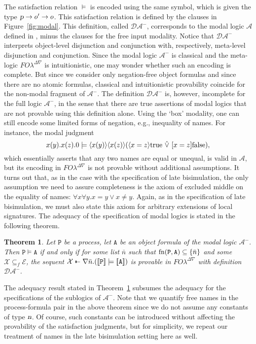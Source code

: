 \documentclass{acmtrans2m}
\newtheorem{theorem}{Theorem}
\def \mTrue {\hbox{true}}
\def \mFalse {\hbox{false}}
\def \mOr {\hat \lor}
\newcommand \mDia[1] {\langle #1 \rangle}
\newcommand \stf[2] {#1 \models #2}
\newcommand \actBox[2] {[#1] #2}
\newcommand \actDia[2] {\langle #1 \rangle #2}
\def\Ascr{{\mathcal A}}
\def\Dscr{{\mathcal D}}
\def\Escr{{\mathcal E}}
\def\Xscr{{\mathcal X}}
\def\Api{{\mathtt A}}
\def\Ppi{{\mathtt P}}
\def\relbar{\mathrel{\smash-}}
\def\joinrelm{\mathrel{\mkern-3.2mu}}
\def\tailpiece{\kern 1pt\vrule height 1ex width 0.3ex depth -.25ex}
\def\seqsym{\mathrel{\tailpiece\joinrelm\relbar}}
\newcommand{\FOL   }{FO\lambda}
\newcommand{\FOLDNb}{\FOL^{\Delta\nabla}}
\newcommand{\Seq}[2]{#1\seqsym #2}
\newcommand{\name}{\hbox{\sl n}}
\newcommand{\proc}{\hbox{\sl p}}
\newcommand{\ra}{\rightarrow}
\newcommand{\trans}[1]{[\![ #1 ]\!]}
\newcommand{\fn}[1]{{\rm fn}(#1)}
\begin{document}
The satisfaction relation $\models$ is encoded using the same symbol, 
which is given the type $\proc \ra o' \ra o$. This satisfaction
relation is defined by the clauses in Figure~\ref{fig:modal}.
This definition, called $\Dscr\Ascr^-$, 
corresponds to the modal logic $\Ascr$ defined in \cite{milner93tcs}, minus
the clauses for the free input modality.  
Notice that $\Dscr\Ascr^-$ interprets object-level disjunction and conjunction
with, respectively, meta-level disjunction and conjunction. Since the modal logic $\Ascr^-$
is classical and the meta-logic $\FOLDNb$ is intuitionistic, 
one may wonder whether such an encoding is complete. But since 
we consider only negation-free object formulas and since 
there are no atomic formulas, classical and intuitionistic provability
coincide for the non-modal fragment of $\Ascr^-$.
The definition $\Dscr\Ascr^-$ is, however, incomplete for the full logic $\Ascr^-$, 
in the sense that there are true assertions of modal logics that are not provable 
using this definition alone. Using the `box' modality, one can still encode 
some limited forms of negation, e.g., inequality of names. For instance, the modal judgment 
$$
\stf {x(y).x(z).0} {\mDia{x(y)} \mDia{x(z)} (\actDia{x = z} \mTrue ~ \mOr ~ \actBox{x = z} \mFalse)},
$$
which essentially asserts that any two names are equal or unequal, is valid in $\Ascr$, 
but its encoding in $\FOLDNb$ is not provable without additional assumptions. 
It turns out that, as in the case with the specification of late bisimulation,
the only assumption we need to assure completeness is the 
axiom of excluded middle on the equality of names: 
$
\forall x\forall y. x = y \lor x \not = y. 
$
Again, as in the specification of late bisimulation, we must also
state this axiom for arbitrary extensions of local signatures. 
The adequacy of the specification of modal logics is 
stated in the following theorem.

\begin{theorem}
\label{thm:modal adequacy}
Let $\Ppi$ be a process, let $\Api$ be an object formula of the modal logic $\Ascr^-$. 
Then $\Ppi \models \Api$ if and only if for some
list $\bar n$ such that $\fn{\Ppi, \Api} \subseteq \{\bar n \} $
and some  $\Xscr \subseteq_f \Escr$,  
the sequent 
$\Seq{\Xscr}{\nabla \bar n.(\trans{\Ppi} \models \trans{\Api})}$
is provable in $\FOLDNb$ with definition $\Dscr\Ascr^-$.
\end{theorem}

The adequacy result stated in Theorem~\ref{thm:modal adequacy}
subsumes the adequacy for the specifications of the sublogics of $\Ascr^-$.
Note that we quantify free names in the process-formula pair
in the above theorem since we do not assume any constants
of type $\name$. Of course, such constants can be introduced
without affecting the provability of the satisfaction 
judgments, but for simplicity, we repeat our treatment of names in the
late bisimulation setting here as well.
\end{document}
